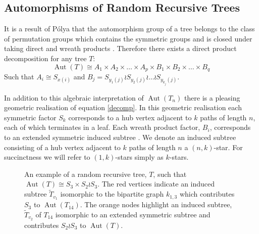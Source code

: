 \documentclass[oneside]{book} %
\theoremstyle{definition}
\numberwithin{equation}{section}
\DeclareMathOperator{\Aut}{Aut} %
\begin{document}
\subsection{Automorphisms of Random Recursive Trees}\label{sec:aorrt}
 It is a result of P\'{o}lya that the automorphism group of a tree belongs to the class of permutation groups which contains the symmetric groups and is closed under taking direct and wreath products \cite{biggs:1993}. Therefore there exists a direct product decomposition for any tree $T$:
 \begin{equation}\label{decomp}
  \Aut(T) \cong A_{1} \times A_{2} \times\dots\times A_{p} \times B_{1} \times B_{2} \times \dots \times B_{q}
 \end{equation}
Such that $A_{i} \cong S_{x(i)}$ and $B_{j} = S_{y_{1}(j)} \wr S_{y_{2}(j)} \wr \dots \wr S_{y_{k_{j}}(j)}$.

In addition to this algebraic interpretation of $\Aut(T_{n})$ there is a pleasing geometric realisation of equation \ref{decomp}.  In this geometric realisation each symmetric factor $S_k$ corresponds to a hub vertex adjacent to $k$ paths of length $n$, each of which terminates in a leaf. Each wreath product factor, $B_{i}$, corresponds to an extended symmetric induced subtree \cite{Ben}. We denote an induced subtree consisting of a hub vertex adjacent to $k$ paths of length $n$ a $(n,k)$-star.  For succinctness we will refer to $(1,k)$-stars simply as $k$-stars.

\begin{figure}[ht]
\centering
{}
\caption{An example of a random recursive tree, $T$, such that $\Aut(T) \cong S_{3} \times S_{2}\wr S_{3}$.  
The red vertices indicate an induced subtree $\tilde{T}_{v_{1}}$ isomorphic to the bipartite graph $k_{1,3}$ which 
contributes $S_{3}$ to $\Aut(T_{14})$. The orange nodes highlight an induced subtree, $\tilde{T}_{v_{2}}$ of $T_{14}$ 
isomorphic to an extended symmetric subtree and contributes $S_{2}\wr S_{3}$ to $\Aut(T)$.}\label{fig2}
\end{figure}
\end{document}
